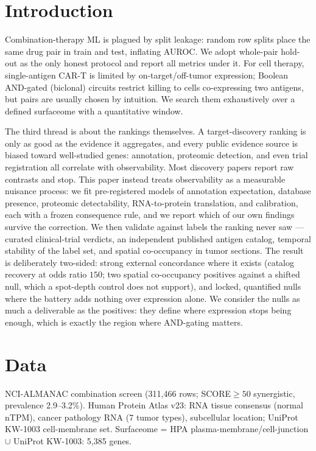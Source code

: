 \documentclass[11pt]{article}
\begin{document}
\section{Introduction}
Combination-therapy ML is plagued by split leakage: random row splits place the same drug pair in train and test, inflating AUROC. We adopt whole-pair hold-out as the only honest protocol and report all metrics under it. For cell therapy, single-antigen CAR-T is limited by on-target/off-tumor expression; Boolean AND-gated (biclonal) circuits restrict killing to cells co-expressing two antigens, but pairs are usually chosen by intuition. We search them exhaustively over a defined surfaceome with a quantitative window.

The third thread is about the rankings themselves. A target-discovery ranking
is only as good as the evidence it aggregates, and every public evidence source
is biased toward well-studied genes: annotation, proteomic detection, and even
trial registration all correlate with observability. Most discovery papers
report raw contrasts and stop. This paper instead treats observability as a
measurable nuisance process: we fit pre-registered models of annotation
expectation, database presence, proteomic detectability, RNA-to-protein
translation, and calibration, each with a frozen consequence rule, and we
report which of our own findings survive the correction. We then validate
against labels the ranking never saw --- curated clinical-trial verdicts, an
independent published antigen catalog, temporal stability of the label set,
and spatial co-occupancy in tumor sections. The result is deliberately
two-sided: strong external concordance where it exists (catalog recovery at
odds ratio $150$; two spatial co-occupancy positives against a shifted null, which a spot-depth control does not support), and locked, quantified
nulls where the battery adds nothing over expression alone. We consider the
nulls as much a deliverable as the positives: they define where expression
stops being enough, which is exactly the region where AND-gating matters.
\section{Data}
NCI-ALMANAC combination screen (311{,}466 rows; SCORE$\ge50$ synergistic, prevalence 2.9--3.2\%). Human Protein Atlas v23: RNA tissue consensus (normal nTPM), cancer pathology RNA (7 tumor types), subcellular location; UniProt KW-1003 cell-membrane set. Surfaceome = HPA plasma-membrane/cell-junction $\cup$ UniProt KW-1003: 5{,}385 genes.
\end{document}
